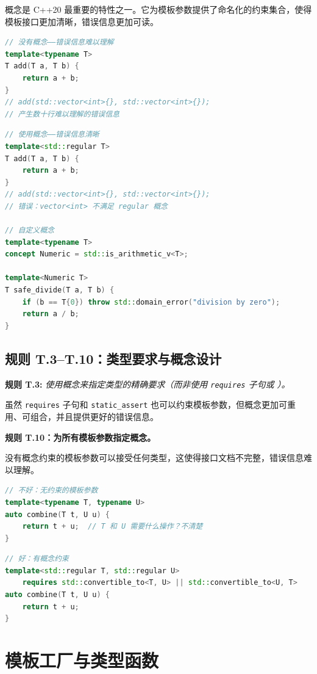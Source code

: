 概念是 C++20 最重要的特性之一。它为模板参数提供了命名化的约束集合，使得模板接口更加清晰，错误信息更加可读。

\begin{lstlisting}[language=C++]
// 没有概念——错误信息难以理解
template<typename T>
T add(T a, T b) {
    return a + b;
}
// add(std::vector<int>{}, std::vector<int>{});
// 产生数十行难以理解的错误信息
\end{lstlisting}

\begin{lstlisting}[language=C++]
// 使用概念——错误信息清晰
template<std::regular T>
T add(T a, T b) {
    return a + b;
}
// add(std::vector<int>{}, std::vector<int>{});
// 错误：vector<int> 不满足 regular 概念

// 自定义概念
template<typename T>
concept Numeric = std::is_arithmetic_v<T>;

template<Numeric T>
T safe_divide(T a, T b) {
    if (b == T{0}) throw std::domain_error("division by zero");
    return a / b;
}
\end{lstlisting}

\subsection{规则 T.3--T.10：类型要求与概念设计}

\textbf{规则 T.3:} \textit{使用概念来指定类型的精确要求（而非使用 \texttt{requires} 子句或 \texttt{}）。}

虽然 \texttt{requires} 子句和 \texttt{static\_assert} 也可以约束模板参数，但概念更加可重用、可组合，并且提供更好的错误信息。

\textbf{规则 T.10：为所有模板参数指定概念。}

没有概念约束的模板参数可以接受任何类型，这使得接口文档不完整，错误信息难以理解。

\begin{lstlisting}[language=C++]
// 不好：无约束的模板参数
template<typename T, typename U>
auto combine(T t, U u) {
    return t + u;  // T 和 U 需要什么操作？不清楚
}
\end{lstlisting}

\begin{lstlisting}[language=C++]
// 好：有概念约束
template<std::regular T, std::regular U>
    requires std::convertible_to<T, U> || std::convertible_to<U, T>
auto combine(T t, U u) {
    return t + u;
}
\end{lstlisting}

\section{模板工厂与类型函数}


